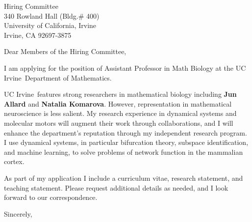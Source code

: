 \documentclass[11pt,a4paper]{letter}
\begin{document}
\def\School{UC Irvine}
\begin{letter}
{Hiring Committee\\
340 Rowland Hall (Bldg.\# 400)\\
University of California, Irvine\\
Irvine, CA 92697-3875}


\opening{Dear Members of the Hiring Committee,}

I am applying for the position of Assistant Professor in Math Biology at the \School~Department of Mathematics. 



\School~features strong researchers in mathematical biology including \textbf{Jun Allard} and \textbf{Natalia Komarova}. However, representation in mathematical neuroscience is less salient. My research experience in dynamical systems and molecular motors will augment their work through collaborations, and I will enhance the department's reputation through my independent research program. I use dynamical systems, in particular bifurcation theory, subspace identification, and machine learning, to solve problems of network function in the mammalian cortex.



As part of my application I include a curriculum vitae, research statement, and teaching statement. Please request additional details as needed, and I look forward to our correspondence.

\closing{Sincerely,}
\end{letter}
\end{document}
